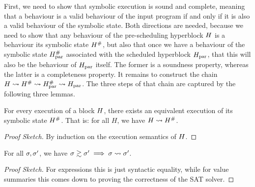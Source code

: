 {%

First, we need to show that symbolic execution is sound and complete, meaning
that a behaviour is a valid behaviour of the input program if and only if it is
also a valid behaviour of the symbolic state.  Both directions are needed,
because we need to show that any behaviour of the pre-scheduling hyperblock
$H$ is a behaviour its symbolic state $H^{\#}$, but also that
once we have a behaviour of the symbolic state $H_\text{par}^{\#}$ associated
with the scheduled hyperblock $H_\text{par}$, that this will also be the behaviour of
$H_\text{par}$ itself.  The former is a soundness property, whereas the latter is a
completeness property.  It remains to construct the chain
$H \mathrel{\leadsto} H^{\#} \mathrel{\leadsto} H_\text{par}^{\#} \mathrel{\leadsto} H_\text{par}$. The
three steps of that chain are captured by the following three lemmas.

\begin{lemma}\label{thm:soundness}
  For every execution of a block $H$, there exists an equivalent execution
  of its symbolic state $H^{\#}$. That is: for all $H$, we have
  $H \mathrel{\leadsto} H^{\#}$.

  \begin{proof}[Proof Sketch]
    By induction on the execution semantics of $H$. %
  \end{proof}
\end{lemma}

\begin{lemma}\label{thm:correctness} For all $\sigma, \sigma'$, we have
  $\sigma \gtrsim
    \sigma' \implies \sigma \mathrel{\leadsto} \sigma'$.

  \begin{proof}[Proof Sketch] For
    expressions this is just syntactic equality, while for value summaries
    this comes down to proving the correctness of the SAT solver.
  \end{proof}
\end{lemma}

}
